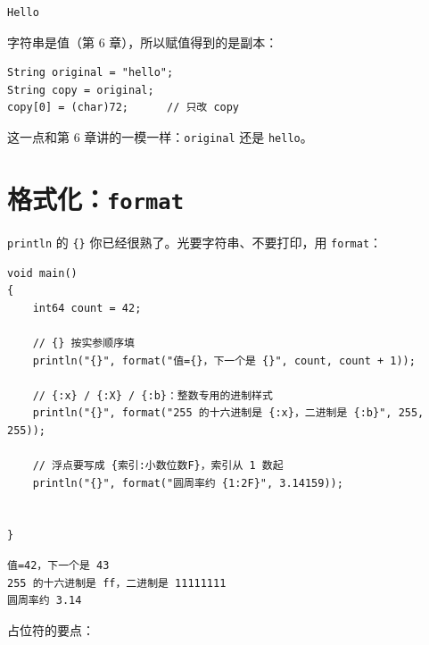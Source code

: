 \par
\medskip
\begin{lstlisting}[style=out]
Hello
\end{lstlisting}
\par
\medskip

字符串是值（第 6 章），所以赋值得到的是副本：

\par
\medskip
\begin{lstlisting}[style=out]
String original = "hello";
String copy = original;
copy[0] = (char)72;      // 只改 copy
\end{lstlisting}
\par
\medskip

这一点和第 6 章讲的一模一样：\texttt{original} 还是 \texttt{hello}。

\section{格式化：\texttt{format}}

\texttt{println} 的 \texttt{\{\}} 你已经很熟了。光要字符串、不要打印，用 \texttt{format}：

\par
\medskip
\begin{lstlisting}[style=chali]
void main()
{
    int64 count = 42;

    // {} 按实参顺序填
    println("{}", format("值={}，下一个是 {}", count, count + 1));

    // {:x} / {:X} / {:b}：整数专用的进制样式
    println("{}", format("255 的十六进制是 {:x}，二进制是 {:b}", 255, 255));

    // 浮点要写成 {索引:小数位数F}，索引从 1 数起
    println("{}", format("圆周率约 {1:2F}", 3.14159));


}
\end{lstlisting}
\par
\medskip

\par
\medskip
\begin{lstlisting}[style=out]
值=42，下一个是 43
255 的十六进制是 ff，二进制是 11111111
圆周率约 3.14
\end{lstlisting}
\par
\medskip

占位符的要点：


